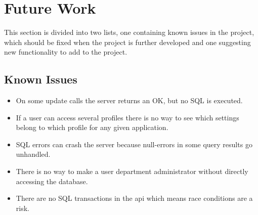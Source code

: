 \section{Future Work}
This section is divided into two lists, one containing known issues in the project, which should be fixed when the project is further developed and one suggesting new functionality to add to the project.

\subsection{Known Issues}\label{subs:known_bugs}
\begin{itemize}
\item On some update calls the server returns an OK, but no SQL is executed.
\item If a user can access several profiles there is no way to see which settings belong to which profile for any given application.
\item SQL errors can crash the server because null-errors in some query results go unhandled.
\item There is no way to make a user department administrator without directly accessing the database.
\item There are no SQL transactions in the \ac{api} which means race conditions are a risk. 
\end{itemize}

